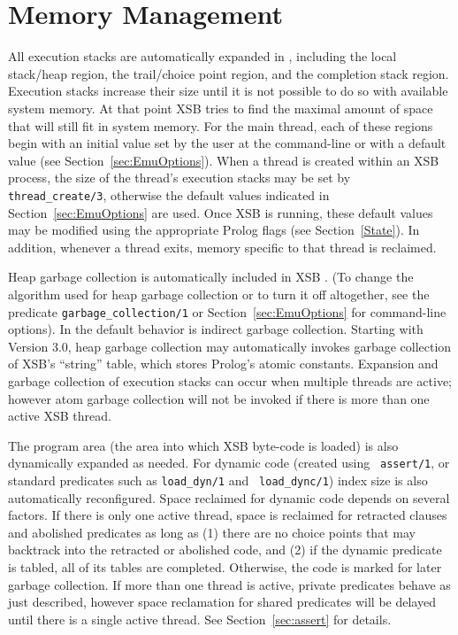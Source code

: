 \section{Memory Management}\label{memory_management}
 

All execution stacks are automatically expanded in \version{},
including the local stack/heap region, the trail/choice point region,
and the completion stack region.  Execution stacks increase their size
until it is not possible to do so with available system memory.  At
that point XSB tries to find the maximal amount of space that will
still fit in system memory.  For the main thread, each of these
regions begin with an initial value set by the user at the
command-line or with a default value (see
Section~\ref{sec:EmuOptions}).  When a thread is created within an XSB
process, the size of the thread's execution stacks may be set by {\tt
  thread\_create/3}, otherwise the default values indicated in
Section~\ref{sec:EmuOptions} are used.  Once XSB is running, these
default values may be modified using the appropriate Prolog flags (see
Section~\ref{State}).  In addition, whenever a thread exits, memory
specific to that thread is reclaimed.  

Heap garbage collection is automatically included in XSB
\cite{CaSC01,CATmem@ISMM-98}.  (To change the algorithm used for heap
garbage collection or to turn it off altogether, see the predicate
{\tt garbage\_collection/1} or Section~\ref{sec:EmuOptions} for
command-line options).  In \version{} the default behavior is indirect
garbage collection.  Starting with Version 3.0, heap garbage
collection may automatically invokes garbage collection of XSB's
``string'' table, which stores Prolog's atomic constants.  Expansion
and garbage collection of execution stacks can occur when multiple
threads are active; however atom garbage collection will not be
invoked if there is more than one active XSB thread.

The program area (the area into which XSB byte-code is loaded) is also
dynamically expanded as needed.  For dynamic code (created using {\tt
  assert/1}, or standard predicates such as {\tt load\_dyn/1} and {\tt
  load\_dync/1}) index size is also automatically reconfigured.  Space
reclaimed for dynamic code depends on several factors.  If there is
only one active thread, space is reclaimed for retracted clauses and
abolished predicates as long as (1) there are no choice points that
may backtrack into the retracted or abolished code, and (2) if the
dynamic predicate is tabled, all of its tables are completed.
Otherwise, the code is marked for later garbage collection.  If more
than one thread is active, private predicates behave as just
described, however space reclamation for shared predicates will be
delayed until there is a single active thread.  See
Section~\ref{sec:assert} for details.

